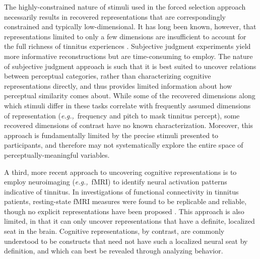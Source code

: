\documentclass[11pt, notitlepage]{article} %
\def\eg{{\emph{e.g.,}}~}
\begin{document}
The highly-constrained nature of stimuli used in the forced selection approach necessarily results
in recovered representations that are correspondingly constrained and typically low-dimensional. It has
long been known, however, that representations limited to only a few dimensions are insufficient to
account for the full richness of tinnitus experiences
\cite{vajsakovicPrinciplesMethodsPsychoacoustic2021,henryMeasurementTinnitus2016}.
Subjective judgment experiments yield more informative reconstructions but are time-consuming to employ.
The nature of subjective judgment
approach is such that it is best suited to uncover relations between perceptual categories, rather than
characterizing cognitive representations directly, and thus provides limited information about how
perceptual similarity comes about. While some of the recovered dimensions along which stimuli differ in
these tasks correlate with frequently assumed dimensions of representation (\eg frequency and pitch to mask tinnitus percept),
some recovered dimensions of contrast have no known characterization.
Moreover, this approach is fundamentally limited by the precise stimuli presented to participants, and
therefore may not systematically explore the entire space of perceptually-meaningful variables.

A third, more recent approach to uncovering cognitive representations is to employ neuroimaging
(\eg fMRI) to identify neural activation patterns indicative of tinnitus.
In investigations of functional connectivity in tinnitus patients,
resting-state fMRI measures were found to be replicable and reliable,
though no explicit representations have been proposed
\cite{husainReplicabilityNeuralBehavioral2019}.
This approach is also
limited, in that it can only uncover representations that have a definite, localized seat in the brain.
Cognitive representations, by contrast, are commonly understood to be constructs that need not have
such a localized neural seat by definition, and which can best be revealed through analyzing behavior.
\end{document}
